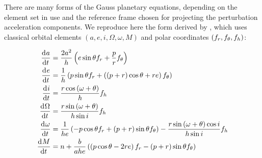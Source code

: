 There are many forms of the Gauss planetary equations, depending on the element set in use and the reference frame chosen for projecting the perturbation acceleration components. We reproduce here the form derived by \cite{battin1999introduction}, which uses classical orbital elements $(a, e, i, \Omega, \omega, M)$ and polar coordinates $(f_r, f_{\theta}, f_h)$:
% 
% 
% 
% 
% 
% 
%
%

\begin{align}
\deriv{a}{t} & = \frac{2 a^2}{h} \left( e \sin{\ta} f_r + \frac{p}{r} f_{\ta} \right) \\
\deriv{e}{t} & = \frac{1}{h} \left( p \sin{\ta} f_r + \left( \left( p + r \right) \cos{\ta} + r e \right) f_{\theta} \right) \\
\deriv{i}{t} & = \frac{r \cos{\arglat}}{h} f_h \\
\deriv{\Omega}{t} & = \frac{r \sin{\arglat}}{h \sin{i}} f_h \\
\deriv{\omega}{t} & = \frac{1}{he} \left( -p \cos{\ta} f_r + \left( p + r \right) \sin{\ta} f_{\theta} \right) - \frac{r \sin{\arglat} \cos{i}}{h \sin{i}} f_h \\
\deriv{M}{t} & = n + \frac{b}{ahe} \left( \left( p \cos{\ta} - 2 re \right) f_r - \left( p + r \right) \sin{\ta} f_{\ta} \right) \\
\end{align}

